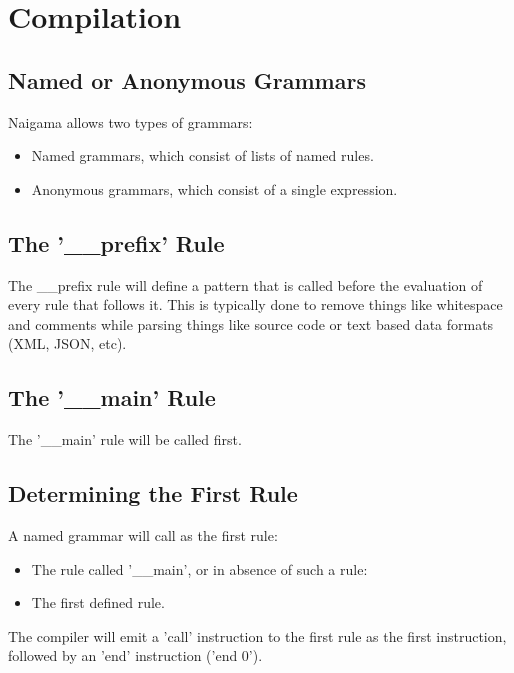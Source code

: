 \section{Compilation}

\subsection{Named or Anonymous Grammars}

Naigama allows two types of grammars:

\begin{itemize}
\item Named grammars, which consist of lists of named rules.
\item Anonymous grammars, which consist of a single expression.
\end{itemize}

\subsection{The '\_\_prefix' Rule}

The \_\_prefix rule will define a pattern that is called before
the evaluation of every rule that follows it. This is typically
done to remove things like whitespace and comments while parsing
things like source code or text based data formats (XML, JSON, etc).

\subsection{The '\_\_main' Rule}

The '\_\_main' rule will be called first.

\subsection{Determining the First Rule}

A named grammar will call as the first rule:

\begin{itemize}
\item The rule called '\_\_main', or in absence of such a rule:
\item The first defined rule.
\end{itemize}

The compiler will emit a 'call' instruction to the first rule as the
first instruction, followed by an 'end' instruction ('end 0').
